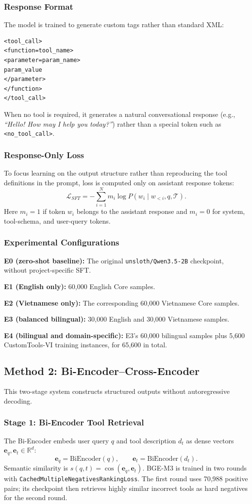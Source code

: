 \documentclass[10pt,twocolumn,a4paper]{article}
\begin{document}
\subsubsection{Response Format}
The model is trained to generate custom tags rather than standard XML:
\begin{verbatim}
<tool_call>
<function=tool_name>
<parameter=param_name>
param_value
</parameter>
</function>
</tool_call>
\end{verbatim}
When no tool is required, it generates a natural conversational response (e.g., \textit{``Hello! How may I help you today?''}) rather than a special token such as \texttt{<no\_tool\_call>}.

\subsubsection{Response-Only Loss}
To focus learning on the output structure rather than reproducing the tool definitions in the prompt, loss is computed only on assistant response tokens:
\[
\mathcal{L}_{SFT}=-\sum_{i=1}^{N}m_i\log P(w_i\mid w_{<i},q,\mathcal{T}).
\]
Here $m_i=1$ if token $w_i$ belongs to the assistant response and $m_i=0$ for system, tool-schema, and user-query tokens.

\subsubsection{Experimental Configurations}
\noindent\textbf{E0 (zero-shot baseline):} The original \texttt{unsloth/}\allowbreak\texttt{Qwen3.5-2B} checkpoint, without project-specific SFT.

\noindent\textbf{E1 (English only):} 60,000 English Core samples.

\noindent\textbf{E2 (Vietnamese only):} The corresponding 60,000 Vietnamese Core samples.

\noindent\textbf{E3 (balanced bilingual):} 30,000 English and 30,000 Vietnamese samples.

\noindent\textbf{E4 (bilingual and domain-specific):} E3's 60,000 bilingual samples plus 5,600 CustomTools-VI training instances, for 65,600 in total.

\subsection{Method 2: Bi-Encoder--Cross-Encoder}
This two-stage system constructs structured outputs without autoregressive decoding.

\subsubsection{Stage 1: Bi-Encoder Tool Retrieval}
The Bi-Encoder embeds user query $q$ and tool description $d_t$ as dense vectors $\mathbf{e}_q,\mathbf{e}_t\in\mathbb{R}^{d}$:
\[
\mathbf{e}_q=\text{BiEncoder}(q),\qquad\mathbf{e}_t=\text{BiEncoder}(d_t).
\]
Semantic similarity is $s(q,t)=\cos(\mathbf{e}_q,\mathbf{e}_t)$. BGE-M3 is trained in two rounds with \texttt{CachedMultipleNegativesRankingLoss}. The first round uses 70,988 positive pairs; its checkpoint then retrieves highly similar incorrect tools as hard negatives for the second round.
\end{document}
